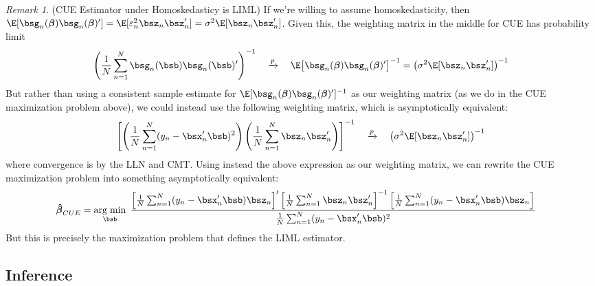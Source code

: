 \documentclass[12pt]{article}
\theoremstyle{plain}
\theoremstyle{definition}
\theoremstyle{remark}
\newtheorem*{rmk}{Remark}
\newcommand{\ra}{\rightarrow}
\newcommand{\bsbeta}{\boldsymbol{\beta}}
\newcommand{\bshatbeta}{\boldsymbol{\hat{\beta}}}
\DeclareMathOperator*{\argmin}{arg\;min}
\newcommand{\pto}{\xrightarrow{p}}
\newcommand{\sumnN}{\sum^N_{n=1}}
\begin{document}
\begin{rmk}(CUE Estimator under Homoskedasticy is LIML)
If we're willing to assume homoskedasticity, then
$\E[\bsg_n(\bsbeta)\bsg_n(\bsbeta)']=\E[\varepsilon_n^2\bsz_n\bsz_n']=\sigma^2
\E[\bsz_n\bsz_n']$. Given this,
the weighting matrix in the middle for CUE has probability limit
\begin{align}
  \left(
  \frac{1}{N}\sumnN
  \bsg_n(\bsb)\bsg_n(\bsb)'
  \right)^{-1}
  \quad \pto\quad
  \E\big[
  \bsg_n(\bsbeta)\bsg_n(\bsbeta)'
  \big]^{-1} =
  \left(\sigma^2 \E[\bsz_n\bsz_n']\right)^{-1}
  \label{sendog:cue}
\end{align}
But rather than using a consistent sample estimate for
$\E[\bsg_n(\bsbeta)\bsg_n(\bsbeta)']^{-1}$ as our weighting matrix (as
we do in the CUE maximization problem above), we could instead use the
following weighting matrix, which is asymptotically equivalent:
\begin{align*}
  \left[
    \left(
      \frac{1}{N}\sumnN (y_n-\bsx_n'\bsb)^2
    \right)
    \left(
      \frac{1}{N}\sumnN \bsz_n\bsz_n'
    \right)
  \right]^{-1}
  \quad\pto\quad
  \left(\sigma^2 \E[\bsz_n\bsz_n']\right)^{-1}
\end{align*}
where convergence is by the LLN and CMT.
Using instead the above expression as our weighting matrix, we can
rewrite the CUE maximization problem into something asymptotically
equivalent:
\begin{align*}
  \bshatbeta_{CUE} &=
  \argmin_{\bsb}\;
  \frac{%
  \left[
  \frac{1}{N} \sumnN (y_n-\bsx_n'\bsb)\bsz_n
  \right]'
  \left[
    \frac{1}{N}\sumnN \bsz_n\bsz_n'
  \right]^{-1}
  \left[
  \frac{1}{N} \sumnN (y_n-\bsx_n'\bsb)\bsz_n
  \right]
  }{\frac{1}{N}\sumnN (y_n-\bsx_n'\bsb)^2}
\end{align*}
But this is precisely the maximization problem that defines the LIML
estimator.
\end{rmk}



\clearpage
\subsection{Inference}
\end{document}
